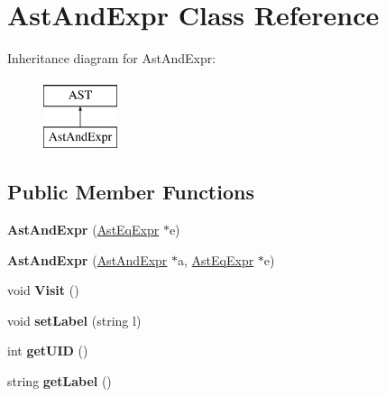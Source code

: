 \hypertarget{classAstAndExpr}{\section{Ast\-And\-Expr Class Reference}
\label{classAstAndExpr}
}
Inheritance diagram for Ast\-And\-Expr\-:\begin{figure}[H]
\begin{center}
\leavevmode
\includegraphics[height=2.000000cm]{classAstAndExpr}
\end{center}
\end{figure}
\subsection*{Public Member Functions}
\begin{DoxyCompactItemize}
\item 
\hypertarget{classAstAndExpr_ae16cf8ff39559b3e3888e37bb6c34b07}{{\bfseries Ast\-And\-Expr} (\hyperlink{classAstEqExpr}{Ast\-Eq\-Expr} $\ast$e)}\label{classAstAndExpr_ae16cf8ff39559b3e3888e37bb6c34b07}

\item 
\hypertarget{classAstAndExpr_ace64f90b89de62e5099b3cf1a853972e}{{\bfseries Ast\-And\-Expr} (\hyperlink{classAstAndExpr}{Ast\-And\-Expr} $\ast$a, \hyperlink{classAstEqExpr}{Ast\-Eq\-Expr} $\ast$e)}\label{classAstAndExpr_ace64f90b89de62e5099b3cf1a853972e}

\item 
\hypertarget{classAstAndExpr_a0d5cb855afb4a400c2c1a8cda617cf9b}{void {\bfseries Visit} ()}\label{classAstAndExpr_a0d5cb855afb4a400c2c1a8cda617cf9b}

\item 
\hypertarget{classAST_a71d680856e95ff89f55d5311a552eba6}{void {\bfseries set\-Label} (string l)}\label{classAST_a71d680856e95ff89f55d5311a552eba6}

\item 
\hypertarget{classAST_ab7a5b1d9f1c2de0d98deb356f724a42c}{int {\bfseries get\-U\-I\-D} ()}\label{classAST_ab7a5b1d9f1c2de0d98deb356f724a42c}

\item 
\hypertarget{classAST_aee029be902fffc927d16ccb03eb922ad}{string {\bfseries get\-Label} ()}\label{classAST_aee029be902fffc927d16ccb03eb922ad}

\end{DoxyCompactItemize}
